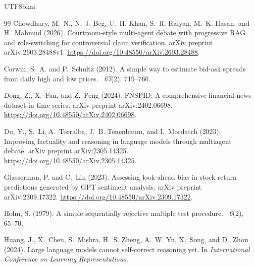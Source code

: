 \documentclass[12pt,a4paper]{article}
\begin{document}
\begin{CJK}{UTF8}{bkai}
\begin{thebibliography}{99}
Chowdhury, M.~N., N.~J. Beg, U.~H. Khan, S.~R. Raiyan, M.~K. Hasan, and
  H.~Mahmud (2026).
\newblock Courtroom-style multi-agent debate with progressive {RAG} and
  role-switching for controversial claim verification.
\newblock arXiv preprint arXiv:2603.28488v1.
\newblock \url{https://doi.org/10.48550/arXiv.2603.28488}.

Corwin, S.~A. and P.~Schultz (2012).
\newblock A simple way to estimate bid-ask spreads from daily high and low
  prices.
~{\em 67\/}(2), 719--760.

Dong, Z., X.~Fan, and Z.~Peng (2024).
\newblock FNSPID: A comprehensive financial news dataset in time series.
\newblock arXiv preprint arXiv:2402.06698.
\newblock \url{https://doi.org/10.48550/arXiv.2402.06698}.

Du, Y., S.~Li, A.~Torralba, J.~B. Tenenbaum, and I.~Mordatch (2023).
\newblock Improving factuality and reasoning in language models through
  multiagent debate.
\newblock arXiv preprint arXiv:2305.14325.
\newblock \url{https://doi.org/10.48550/arXiv.2305.14325}.

Glasserman, P. and C.~Lin (2023).
\newblock Assessing look-ahead bias in stock return predictions generated by
  GPT sentiment analysis.
\newblock arXiv preprint arXiv:2309.17322.
\newblock \url{https://doi.org/10.48550/arXiv.2309.17322}.

Holm, S. (1979).
\newblock A simple sequentially rejective multiple test procedure.
~{\em 6\/}(2), 65--70.

Huang, J., X.~Chen, S.~Mishra, H.~S. Zheng, A.~W. Yu, X.~Song, and D.~Zhou
  (2024).
\newblock Large language models cannot self-correct reasoning yet.
\newblock In {\em International Conference on Learning Representations}.


\end{thebibliography}
\end{CJK}
\end{document}

